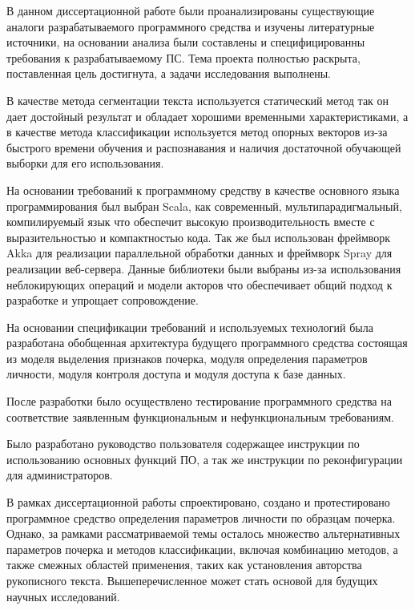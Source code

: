 \label{sec:outro}

В данном диссертационной работе были проанализированы существующие аналоги разрабатываемого программного средства и изучены литературные источники, на основании анализа были составлены и специфицированны требования к разрабатываемому ПС. Тема проекта полностью раскрыта, поставленная цель достигнута, а задачи исследования выполнены.

В качестве метода сегментации текста используется статический метод так он дает достойный результат и обладает хорошими временными характеристиками, а в качестве метода классификации используется метод опорных векторов из-за быстрого времени обучения и распознавания и наличия достаточной обучающей выборки для его использования.

На основании требований к программному средству в качестве основного языка программирования был выбран Scala, как современный, мультипарадигмальный, компилируемый язык что обеспечит высокую производительность вместе с выразительностью и компактностью кода. Так же был использован фреймворк Akka для реализации параллельной обработки данных и фреймворк Spray для реализации веб-сервера. Данные библиотеки были выбраны из-за использования неблокирующих операций и модели акторов что обеспечивает общий подход к разработке и упрощает сопровождение.

На основании спецификации требований и используемых технологий была разработана обобщенная архитектура будущего программного средства состоящая из моделя выделения признаков почерка, модуля определения параметров личности, модуля контроля доступа и модуля доступа к базе данных.

После разработки было осуществлено тестирование программного средства на соответствие заявленным функциональным и нефункциональным требованиям.

Было разработано руководство пользователя содержащее инструкции по использованию основных функций ПО, а так же инструкции по реконфигурации для администраторов.

В рамках диссертационной работы спроектировано, создано и протестировано программное средство определения параметров личности по образцам почерка. Однако, за рамками рассматриваемой темы осталось множество альтернативных параметров почерка и методов классификации, включая комбинацию методов, а также смежных областей применения, таких как установления авторства рукописного текста. Вышеперечисленное может стать основой для будущих научных исследований.